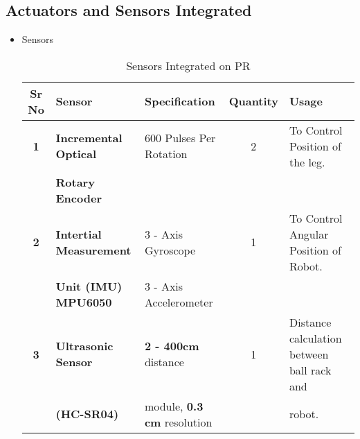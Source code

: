    \subsection{Actuators and Sensors Integrated}
        \begin{itemize}
            \item Sensors
                \begin{table}[h]
                    \caption {Sensors Integrated on PR} \label{Sensors_PR}  \small
                    \begin{tabular}{|c|l|l|c|l|}
                        \hline  \hline
                        \textbf{Sr No}  & \textbf{Sensor}                   & \textbf{Specification}                & \textbf{Quantity} & \textbf{Usage}                                      \\ \hline   \hline
                        \textbf{1}      & \textbf{Incremental Optical}      & 600 Pulses Per Rotation               &        2          & To Control Position of the leg.                     \\
                                        & \textbf{Rotary Encoder}           &                                       &                   &                                                     \\ \hline         
                        \textbf{2}      & \textbf{Intertial Measurement}    & 3 - Axis Gyroscope                    &        1          & To Control Angular Position of  Robot.              \\ 
                                        & \textbf{Unit (IMU) MPU6050}       & 3 - Axis Accelerometer                &                   &                                                     \\ \hline                                     
                        \textbf{3}      & \textbf{Ultrasonic Sensor}        & \textbf{2 - 400cm} distance           &        1          & Distance calculation between ball rack and          \\ 
                                        & \textbf{(HC-SR04)}                & module, \textbf{0.3 cm} resolution    &                   & robot.                                              \\ \hline   \hline
                    \end{tabular}
                \end{table}
                

\end{itemize}
